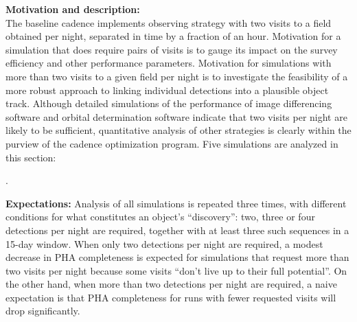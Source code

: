 {\bf Motivation and description:}\\
The baseline cadence implements observing strategy with two visits to
a field obtained per night, separated in time by a fraction of an
hour. Motivation for a simulation that does require pairs of visits is
to gauge its impact on the survey efficiency and other performance
parameters. Motivation for simulations with more than two visits to a
given field per night is to investigate the feasibility of a more
robust approach to linking individual detections into a plausible
object track. Although detailed simulations of the performance of
image differencing software and orbital determination software
indicate that two visits per night are likely to be sufficient,
quantitative analysis of other strategies is clearly within the
purview of the cadence optimization program.  Five simulations are
analyzed in this section:





.








{\bf Expectations:}  Analysis of all simulations is repeated three
times, with different conditions for what constitutes an object's
``discovery'':  two, three or four detections per night are required,
together with at least three such sequences in a 15-day window.  When
only two detections per night are required, a modest decrease in PHA
completeness is expected for simulations that request more than two
visits per night because some visits ``don't live up to their full
potential''. On the other hand, when more than two detections per
night are required, a naive expectation is that PHA completeness for
runs with fewer requested visits will drop significantly. \\

